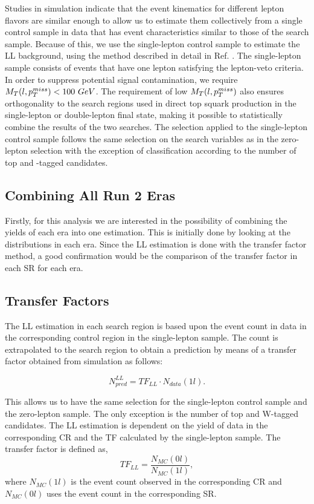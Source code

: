 Studies in simulation indicate that the event kinematics for different lepton flavors are similar enough to allow us to estimate them collectively from a single control sample in data that has event characteristics similar to those of the search sample. Because of this, we use the single-lepton control sample to estimate the LL background, using the method described in detail in Ref. \cite{bravo_search_2015}. The single-lepton sample consists of events that have one lepton satisfying the lepton-veto criteria. In order to suppress potential signal contamination, we require $M_T(l,p_{T}^{miss})<100~GeV$. The requirement of low $M_T(l,p_{T}^{miss})$ also ensures orthogonality to the search regions used in direct top squark production in the single-lepton or double-lepton final state, making it possible to statistically combine the results of the two searches. The selection applied to the single-lepton control sample follows the same selection on the search variables as in the zero-lepton selection with the exception of classification according to the number of top and \W-tagged candidates. 

\subsection{Combining All Run 2 Eras}\label{sec:LLCombination}
Firstly, for this analysis we are interested in the possibility of combining the yields of each era into one estimation. This is initially done by looking at the \met{} distributions in each era. Since the LL estimation is done with the transfer factor method, a good confirmation would be the comparison of the transfer factor in each SR for each era. 


\subsection{Transfer Factors}
\label{subsec:TF}

The LL estimation in each search region is based upon the event count in data in the corresponding control region in the single-lepton sample. The count is extrapolated to the search region to obtain a prediction by means of a transfer factor obtained from simulation as follows: 

\begin{equation}
\label{eqn:LLTF}
N_{pred}^{LL}=TF_{LL} \cdot N_{data}(1l).
\end{equation}

This allows us to have the same selection for the single-lepton control sample and the zero-lepton sample. The only exception is the number of top and W-tagged candidates. The LL estimation is dependent on the yield of data in the corresponding CR and the TF calculated by the single-lepton sample. The transfer factor is defined as, 
\begin{equation}
\label{eqn:TF}
TF_{LL}=\frac{N_{MC}(0l)}{N_{MC}(1l)},
\end{equation}
where $N_{MC}(1l)$ is the event count observed in the corresponding CR and $N_{MC}(0l)$ uses the event count in the corresponding SR. 

